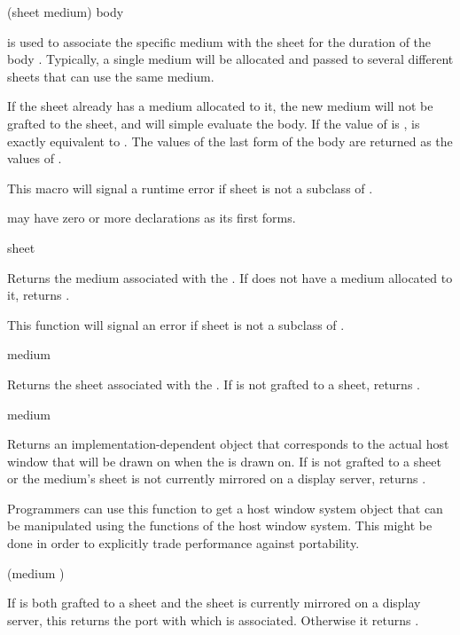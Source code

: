  {(sheet medium) \body body}

 is used to associate the specific medium
 with the sheet  for the duration of the body .
Typically, a single medium will be allocated and passed to several different
sheets that can use the same medium.

If the sheet already has a medium allocated to it, the new medium will not be
grafted to the sheet, and  will simple evaluate the
body.  If the value of  is ,  is
exactly equivalent to .  The values of the last form of
the body are returned as the values of .

This macro will signal a runtime error if sheet is not a subclass of
.

 may have zero or more declarations as its first forms.

 {sheet}

Returns the medium associated with the  .  If 
does not have a medium allocated to it,  returns .

This function will signal an error if sheet is not a subclass of
.

 {medium}

Returns the sheet associated with the  .  If
 is not grafted to a sheet,  returns .

 {medium}

Returns an implementation-dependent object that corresponds to the actual host
window that will be drawn on when the   is drawn on.
If  is not grafted to a sheet or the medium's sheet is not currently
mirrored on a display server,  returns .

Programmers can use this function to get a host window system object that can be
manipulated using the functions of the host window system.  This might be done
in order to explicitly trade performance against portability.

 {(medium )}

If  is both grafted to a sheet and the sheet is currently mirrored
on a display server, this returns the port with which  is
associated.  Otherwise it returns .

